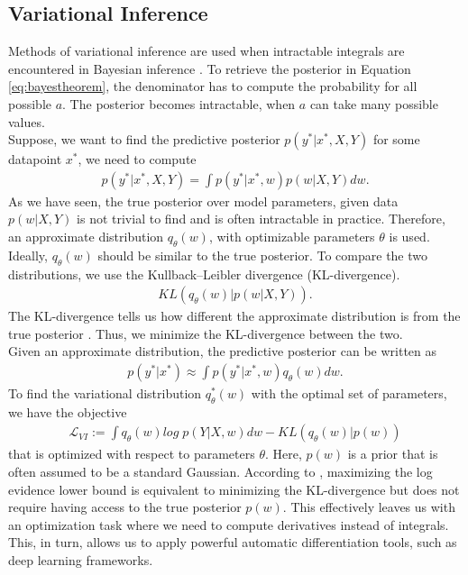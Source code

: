 \documentclass[a4paper,cleardoubleempty,BCOR1cm, 11pt]{report}
\begin{document}
\subsection{Variational Inference}\label{sec:vi}
Methods of variational inference are used when intractable integrals are encountered in Bayesian inference \cite{jordan1999introduction}. To retrieve the posterior in Equation \ref{eq:bayestheorem}, the denominator has to compute the probability for all possible $a$. The posterior becomes intractable, when $a$ can take many possible values.\\
Suppose, we want to find the predictive posterior $p(y^*|x^*, X,Y)$ for some datapoint $x^*$, we need to compute
\begin{align*}
p(y^*|x^*, X,Y) = \int p(y^*|x^*, w)p(w|X,Y)dw.
\end{align*}
As we have seen, the true posterior over model parameters, given data $p(w|X,Y)$ is not trivial to find and is often intractable in practice. Therefore, an approximate distribution $q_{\theta}(w)$, with optimizable parameters $\theta$ is used. Ideally, $q_{\theta}(w)$ should be similar to the true posterior. To compare the two distributions, we use the Kullback–Leibler divergence (KL-divergence).
\begin{align*}
KL(q_{\theta}(w)|p(w|X,Y)).
\end{align*}
The KL-divergence tells us how different the approximate distribution is from the true posterior \cite{Joyce2011}. Thus, we minimize the KL-divergence between the two.\\
Given an approximate distribution, the predictive posterior can be written as
\begin{align*}
p(y^*|x^*) \approx \int p(y^*|x^*, w)q_{\theta}(w)dw.
\end{align*}
To find the variational distribution $q_{\theta}^*(w)$ with the optimal set of parameters, we have the objective
\begin{align*}
\mathcal{L}_{VI} := \int q_{\theta}(w) log\;p(Y|X, w)dw - KL(q_{\theta}(w)|p(w))
\end{align*}
that is optimized with respect to parameters $\theta$. Here, $p(w)$ is a prior that is often assumed to be a standard Gaussian. According to \citet{bishop2006pattern}, maximizing the log evidence lower bound is equivalent to minimizing the KL-divergence but does not require having access to the true posterior $p(w)$. This effectively leaves us with an optimization task where we need to compute derivatives instead of integrals. This, in turn, allows us to apply powerful automatic differentiation tools, such as deep learning frameworks.
\end{document}
